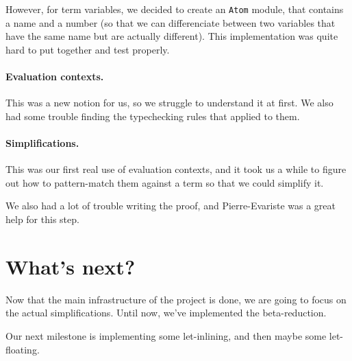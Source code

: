\documentclass{article}
\begin{document}
However, for term variables, we decided to create an {\tt Atom} module, that contains 
a name and a number (so that we can differenciate between two variables that have the same 
name but are actually different).
This implementation was quite hard to put together and test properly.

\paragraph{Evaluation contexts.}This was a new notion for us, so we struggle to understand it at first.
We also had some trouble finding the typechecking rules that applied to them.

\paragraph{Simplifications.}This was our first real use of evaluation contexts, and it took us 
a while to figure out how to pattern-match them against a term so that we could simplify it.

We also had a lot of trouble writing the proof, and Pierre-Evariste was a great help for this step.

\section{What's next?}
Now that the main infrastructure of the project is done, we are going to focus on the actual simplifications.
Until now, we've implemented the beta-reduction.

Our next milestone is implementing some let-inlining, and then maybe some let-floating.
\end{document}
